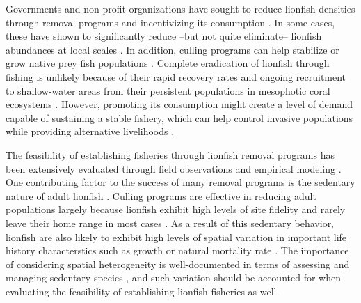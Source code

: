 \documentclass[fleqn,10pt,lineno]{wlpeerj} %
\begin{document}
Governments and non-profit organizations have sought to reduce lionfish
densities through removal programs and incentivizing its consumption
\citep{chin_2016}. In some cases, these have shown to significantly
reduce --but not quite eliminate-- lionfish abundances at local scales
\citep{sandel_2015,chin_2016,deleon_2013}. In addition, culling programs
can help stabilize or grow native prey fish populations
\citep{cote_2014}. Complete eradication of lionfish through fishing is
unlikely because of their rapid recovery rates and ongoing recruitment
to shallow-water areas from their persistent populations in mesophotic
coral ecosystems \citep{barbour_2011,andradibrown_2017}. However,
promoting its consumption might create a level of demand capable of
sustaining a stable fishery, which can help control invasive populations
while providing alternative livelihoods \citep{chin_2016}.

The feasibility of establishing fisheries through lionfish removal
programs has been extensively evaluated through field observations and
empirical modeling
\citep{barbour_2011,morris_2011,deleon_2013,johnston_2015,sandel_2015,chin_2016,usseglio_2017}.
One contributing factor to the success of many removal programs is the
sedentary nature of adult lionfish \citep{jud_2012}. Culling programs
are effective in reducing adult populations largely because lionfish
exhibit high levels of site fidelity and rarely leave their home range
in most cases \citep{Fishelson_1997,cote_2014,kochzius_2005}. As a
result of this sedentary behavior, lionfish are also likely to exhibit
high levels of spatial variation in important life history
characterstics such as growth or natural mortality rate
\citep{hutchinson_2008,wilson_2012}. The importance of considering
spatial heterogeneity is well-documented in terms of assessing and
managing sedentary species \citep{gunderson_2008,guan_2013}, and such
variation should be accounted for when evaluating the feasibility of
establishing lionfish fisheries as well.
\end{document}
